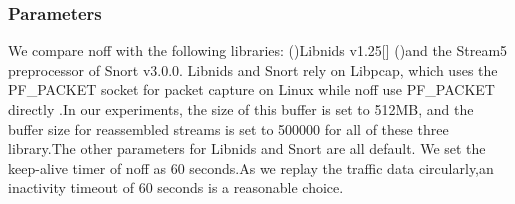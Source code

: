 \documentclass[conference]{IEEEtran}
\begin{document}
\subsubsection{Parameters}
We compare noff with the following libraries: (\uppercase\expandafter{})Libnids v1.25[]
(\uppercase\expandafter{})and the Stream5 preprocessor of Snort v3.0.0. Libnids and Snort rely on Libpcap\cite{IEEE:13}, which uses the PF\_PACKET socket for packet capture on Linux while noff use PF\_PACKET directly .In our experiments, the size of this buffer is set to 512MB, and the buffer size for reassembled streams is set to 500000 for all of these three library.The other parameters for Libnids and Snort are all default.  
We set the keep-alive timer of noff as 60 seconds.As we replay the traffic data circularly,an inactivity timeout of 60 seconds is a reasonable choice.
\end{document}
